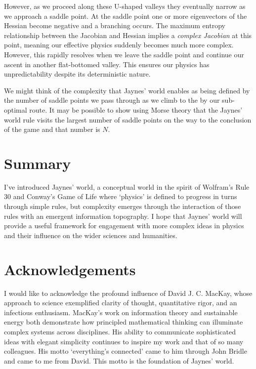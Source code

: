 \documentclass[11pt,a4paper]{article}
\begin{document}
However, as we proceed along these U-shaped valleys they eventually narrow as we approach a saddle point. At the saddle point one or more eigenvectors of the Hessian become negative and a branching occurs. The maximum entropy relationship between the Jacobian and Hessian implies a \emph{complex Jacobian} at this point, meaning our effective physics suddenly becomes much more complex. However, this rapidly resolves when we leave the saddle point and continue our ascent in another flat-bottomed valley. This ensures our physics has unpredictability despite its deterministic nature.

We might think of the complexity that Jaynes' world enables as being defined by the number of saddle points we pass through as we climb to the by our sub-optimal route. It may be possible to show using Morse theory that the Jaynes' world rule visits the largest number of saddle points on the way to the conclusion of the game and that number is $N$. 

\section{Summary}

I've introduced Jaynes' world, a conceptual world in the spirit of Wolfram's Rule 30 and Conway's Game of Life where `physics' is defined to progress in turns through simple rules, but complexity emerges through the interaction of those rules with an emergent information topography. I hope that Jaynes' world will provide a useful framework for engagement with more complex ideas in physics and their influence on the wider sciences and humanities.

\section*{Acknowledgements}

I would like to acknowledge the profound influence of David J. C. MacKay, whose approach to science exemplified clarity of thought, quantitative rigor, and an infectious enthusiasm. MacKay's work on information theory \cite{MacKay-information03} and sustainable energy \cite{MacKay-energy08} both demonstrate how principled mathematical thinking can illuminate complex systems across disciplines. His ability to communicate sophisticated ideas with elegant simplicity continues to inspire my work and that of so many colleagues. His motto `everything's connected' came to him through John Bridle and came to me from David. This motto is the foundation of Jaynes' world.
\end{document}
